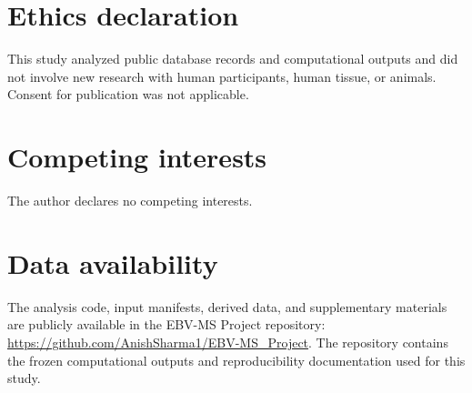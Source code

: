 \documentclass[11pt]{article}
\begin{document}
\section*{Ethics declaration}
This study analyzed public database records and computational outputs and did not involve new research with human participants, human tissue, or animals. Consent for publication was not applicable.

\section*{Competing interests}
The author declares no competing interests.

\section*{Data availability}
The analysis code, input manifests, derived data, and supplementary materials are publicly available in the EBV-MS Project repository: \url{https://github.com/AnishSharma1/EBV-MS_Project}. The repository contains the frozen computational outputs and reproducibility documentation used for this study.

\FloatBarrier

\end{document}
